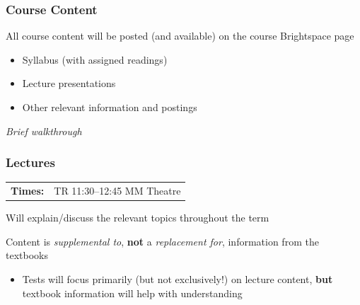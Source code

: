 \documentclass[10pt]{beamer}
\begin{document}
\begin{frame}[t]
\frametitle{Course Content}
\vspace{0.5cm}
All course content will be posted (and available) on the course Brightspace page
	\bigskip
	\begin{itemize}
		\item Syllabus (with assigned readings)
		\bigskip
		\item Lecture presentations
		\bigskip
		\item Other relevant information and postings
	\end{itemize}
	\bigskip
	
	\begin{center}
		\textcolor{myblue2}{\emph{Brief walkthrough}}
	\end{center}
	
\end{frame}



\begin{frame}[t]
\frametitle{Lectures}
\vspace{0.5cm}

	\begin{tabular}{@{} l l}
		\textbf{Times:} & TR 11:30--12:45 MM Theatre
	\end{tabular}
	
	\vspace{0.5cm}
	
	Will explain/discuss the relevant topics throughout the term
	
	\vspace{0.5cm}
	
	Content is \emph{supplemental to}, \textbf{not} a \emph{replacement for}, information from the textbooks
	
		\begin{itemize}
			\item \small{Tests will focus primarily (but not exclusively!) on lecture content, \textbf{but} textbook information will help with understanding}
		\end{itemize}
\end{frame}
\end{document}
